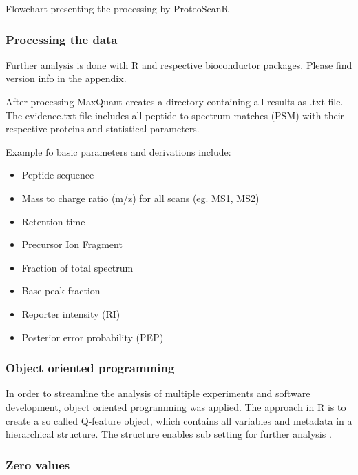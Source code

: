 \documentclass[
  11pt,
]{article}
\providecommand{\tightlist}{%
  \setlength{\itemsep}{0pt}\setlength{\parskip}{0pt}}
\begin{document}
\caption{Flowchart presenting the processing by ProteoScanR}\label{fig:data-processing-pipeline-flowchart-vertical}
 \endfigure\egroup

\hypertarget{processing-the-data}{%
\subsubsection{Processing the data}\label{processing-the-data}}

Further analysis is done with R and respective bioconductor packages. Please find version info in the appendix.

After processing MaxQuant creates a directory containing all results as .txt file. The evidence.txt file includes all peptide to spectrum matches (PSM) with their respective proteins and statistical parameters.

Example fo basic parameters and derivations include:

\begin{itemize}
\tightlist
\item
  Peptide sequence
\item
  Mass to charge ratio (m/z) for all scans (eg. MS1, MS2)
\item
  Retention time
\item
  Precursor Ion Fragment
\item
  Fraction of total spectrum
\item
  Base peak fraction
\item
  Reporter intensity (RI)
\item
  Posterior error probability (PEP)
\end{itemize}

\hypertarget{object-oriented-programming}{%
\subsubsection{Object oriented programming}\label{object-oriented-programming}}

In order to streamline the analysis of multiple experiments and software development, object oriented programming was applied. The approach in R is to create a so called Q-feature object, which contains all variables and metadata in a hierarchical structure. The structure enables sub setting for further analysis \citep{Vanderaa2021}.

\hypertarget{zero-values}{%
\subsubsection{Zero values}\label{zero-values}}
\end{document}
